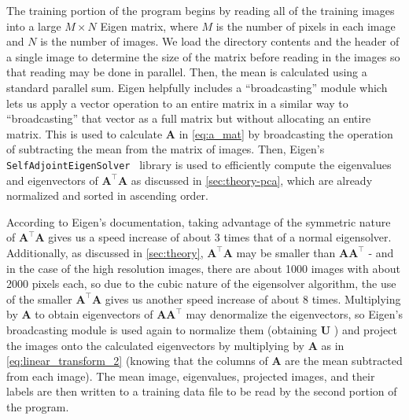 \documentclass[headings=optiontoheadandtoc,listof=totoc,parskip=full]{scrartcl}
\begin{document}
The training portion of the program begins by reading all of the training images into a large $M \times N$ Eigen matrix, where $M$ is the number of pixels in each image and $N$ is the number of images. We load the directory contents and the header of a single image to determine the size of the matrix before reading in the images so that reading may be done in parallel. Then, the mean is calculated using a standard parallel sum. Eigen helpfully includes a ``broadcasting'' module \autocite{eigenBroadcast} which lets us apply a vector operation to an entire matrix in a similar way to ``broadcasting'' that vector as a full matrix but without allocating an entire matrix. This is used to calculate $\mathbf A$ in \cref{eq:a_mat} by broadcasting the operation of subtracting the mean from the matrix of images. Then, Eigen's \texttt{SelfAdjointEigenSolver}~\autocite{eigenSolver} library is used to efficiently compute the eigenvalues and eigenvectors of $\mathbf{A^\top A}$ as discussed in \cref{sec:theory-pca}, which are already normalized and sorted in ascending order. 

According to Eigen's documentation, taking advantage of the symmetric nature of $\mathbf{A^\top A}$ gives us a speed increase of about 3 times that of a normal eigensolver. Additionally, as discussed in \cref{sec:theory}, $\mathbf{A^\top A}$ may be smaller than $\mathbf{AA}^\top$ - and in the case of the high resolution images, there are about 1000 images with about 2000 pixels each, so due to the cubic nature of the eigensolver algorithm, the use of the smaller $\mathbf{A^\top A}$ gives us another speed increase of about 8 times. Multiplying by $\mathbf A$ to obtain eigenvectors of $\mathbf{AA}^\top$ may denormalize the eigenvectors, so Eigen's broadcasting module is used again to normalize them (obtaining $\mathbf U$ ) and project the images onto the calculated eigenvectors by multiplying by $\mathbf A$ as in \cref{eq:linear_transform_2} (knowing that the columns of $\mathbf A$ are the mean subtracted from each image). The mean image, eigenvalues, projected images, and their labels are then written to a training data file to be read by the second portion of the program.
\end{document}
